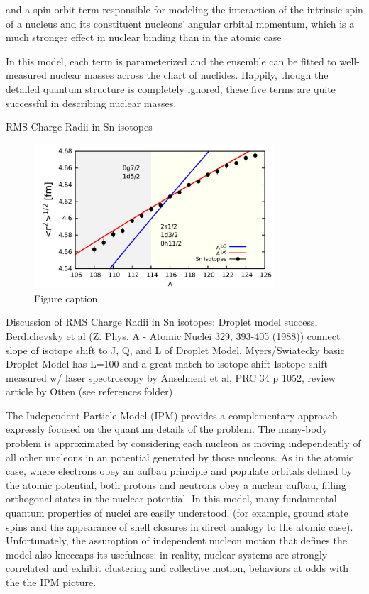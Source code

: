 and a spin-orbit term responsible for modeling the interaction of the intrinsic spin
of a nucleus and its constituent nucleons' angular orbital momentum, which is
a much stronger effect in nuclear binding than in the atomic case

In this model, each term is parameterized and the ensemble can be fitted to
well-measured nuclear masses across the chart of nuclides. Happily, though the detailed
quantum structure is completely ignored, these five terms are quite successful
in describing nuclear masses.

RMS Charge Radii in Sn isotopes
\begin{figure}
    \includegraphics[width=0.8\textwidth]{figures/SnIsotopeRMSRadii.png}
    \caption{Figure caption}
    \label{chart}
\end{figure}

Discussion of RMS Charge Radii in Sn isotopes: Droplet model success,
Berdichevsky et al (Z. Phys. A - Atomic Nuclei 329, 393-405 (1988)) connect
slope of isotope shift to J, Q, and L of Droplet Model, Myers/Swiatecky basic
Droplet Model has L=100 and a great match to isotope shift
Isotope shift measured w/ laser spectroscopy by Anselment et al, PRC 34 p 1052,
review article by Otten (see references folder)

The Independent Particle Model (IPM) provides a complementary approach expressly
focused on the quantum details of the problem. The many-body problem is
approximated by considering each nucleon as moving independently of all other
nucleons in an potential generated by those nucleons. As in the atomic case,
where electrons obey an aufbau principle and populate orbitals defined by the
atomic potential, both protons and neutrons obey a nuclear aufbau, filling
orthogonal states in the nuclear potential. In this model, many fundamental
quantum properties of nuclei are easily understood, (for example, ground state spins and
the appearance of shell closures in direct analogy to the atomic case).
Unfortunately, the assumption of independent nucleon motion that defines the model
also kneecaps its usefulness: in reality, nuclear systems are strongly
correlated and exhibit clustering and collective motion, behaviors at odds with the
the IPM picture.

